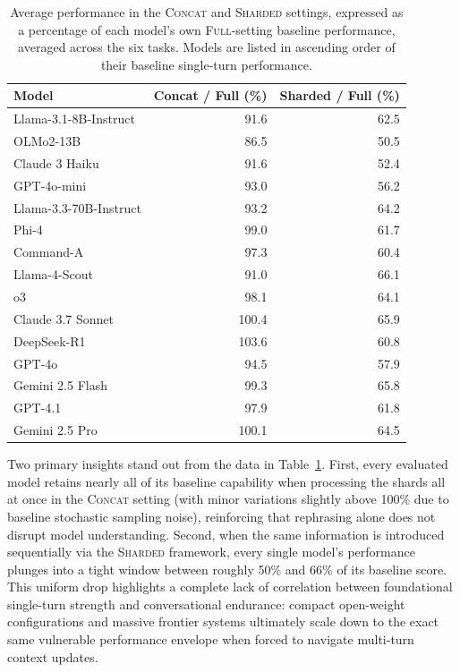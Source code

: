\documentclass[manuscript,review]{acmart}
\begin{document}
\begin{table}[t]
  \centering
  \caption{Average performance in the \textsc{Concat} and \textsc{Sharded} settings, expressed as a percentage of each model's own \textsc{Full}-setting baseline performance, averaged across the six tasks. Models are listed in ascending order of their baseline single-turn performance.}
  \label{tab:overall}
  \begin{tabular}{lrr}
    \toprule
    \textbf{Model} & \textbf{Concat / Full (\%)} & \textbf{Sharded / Full (\%)} \\
    \midrule
    Llama-3.1-8B-Instruct & 91.6 & 62.5 \\
    OLMo2-13B             & 86.5 & 50.5 \\
    Claude 3 Haiku         & 91.6 & 52.4 \\
    GPT-4o-mini             & 93.0 & 56.2 \\
    Llama-3.3-70B-Instruct  & 93.2 & 64.2 \\
    Phi-4                   & 99.0 & 61.7 \\
    Command-A               & 97.3 & 60.4 \\
    Llama-4-Scout            & 91.0 & 66.1 \\
    o3                       & 98.1 & 64.1 \\
    Claude 3.7 Sonnet         & 100.4 & 65.9 \\
    DeepSeek-R1               & 103.6 & 60.8 \\
    GPT-4o                     & 94.5 & 57.9 \\
    Gemini 2.5 Flash            & 99.3 & 65.8 \\
    GPT-4.1                     & 97.9 & 61.8 \\
    Gemini 2.5 Pro                & 100.1 & 64.5 \\
    \bottomrule
  \end{tabular}
\end{table}
 
Two primary insights stand out from the data in Table~\ref{tab:overall}. First, every evaluated model retains nearly all of its baseline capability when processing the shards all at once in the \textsc{Concat} setting (with minor variations slightly above 100\% due to baseline stochastic sampling noise), reinforcing that rephrasing alone does not disrupt model understanding. Second, when the same information is introduced sequentially via the \textsc{Sharded} framework, every single model's performance plunges into a tight window between roughly 50\% and 66\% of its baseline score. This uniform drop highlights a complete lack of correlation between foundational single-turn strength and conversational endurance: compact open-weight configurations and massive frontier systems ultimately scale down to the exact same vulnerable performance envelope when forced to navigate multi-turn context updates.
\end{document}
